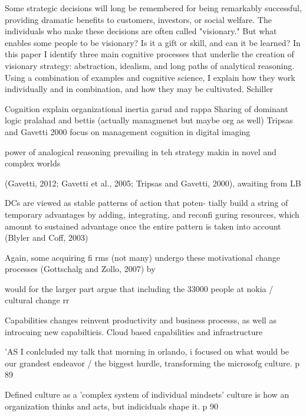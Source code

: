 Some strategic decisions will long be remembered for being remarkably successful, providing dramatic benefits to customers, investors, or social welfare. The individuals who make these decisions are often called "visionary." But what enables some people to be visionary? Is it a gift or skill, and can it be learned? In this paper I identify three main cognitive processes that underlie the creation of visionary strategy: abstraction, idealism, and long paths of analytical reasoning. Using a combination of examples and cognitive science, I explain how they work individually and in combination, and how they may be cultivated.
Schiller




Cognition explain organizational inertia garud and rappa
Sharing of dominant logic pralahad and bettis (actually managmenet but maybe org as well)
Tripsas and Gavetti 2000 focus on management cognition in digital imaging

power of analogical reasoning prevailing in teh strategy makin in novel and complex worlds

(Gavetti, 2012; Gavetti et al., 2005; Tripsas and Gavetti, 2000), awaiting from LB


DCs are viewed as stable patterns of action that poten- tially build a string of temporary
advantages by adding, integrating, and reconfi guring resources, which amount to sustained
advantage once the entire pattern is taken into account (Blyler and Coff, 2003)

Again, some acquiring fi rms (not many) undergo these motivational change processes (Gottschalg and Zollo, 2007) by

would for the larger part argue that 
including the 33000 people at nokia / cultural change rr



Capabilities changes reinvent productivity and business processs, as well as introcuing
new capabiltieis. 
Cloud based capabilities and infrastructure


'AS I conlcluded my talk that morning in orlando, i focused on what would be our grandest
endeavor / the biggest hurdle, transforming the microsofg culture. p 89

Defined culture as a 'complex system of individual mindsets' culture is how an
organization thinks and acts, but indiciduals shape it. p 90



